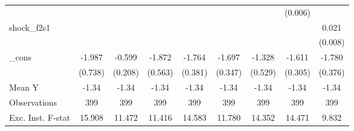 {\begin{tabular}{l*{8}{c}}
            &                     &                     &                     &                     &                     &                     &     (0.006)         &                     \\
\addlinespace
shock\_f2s1  &                     &                     &                     &                     &                     &                     &                     &       0.021\sym{**} \\
            &                     &                     &                     &                     &                     &                     &                     &     (0.008)         \\
\addlinespace
\_cons      &      -1.987\sym{**} &      -0.599\sym{***}&      -1.872\sym{***}&      -1.764\sym{***}&      -1.697\sym{***}&      -1.328\sym{**} &      -1.611\sym{***}&      -1.780\sym{***}\\
            &     (0.738)         &     (0.208)         &     (0.563)         &     (0.381)         &     (0.347)         &     (0.529)         &     (0.305)         &     (0.376)         \\
\midrule
Mean Y      &       -1.34         &       -1.34         &       -1.34         &       -1.34         &       -1.34         &       -1.34         &       -1.34         &       -1.34         \\
Observations&         399         &         399         &         399         &         399         &         399         &         399         &         399         &         399         \\
Exc. Inst. F-stat&      15.908         &      11.472         &      11.416         &      14.583         &      11.780         &      14.352         &      14.471         &       9.832         \\
\bottomrule
\end{tabular}
}
